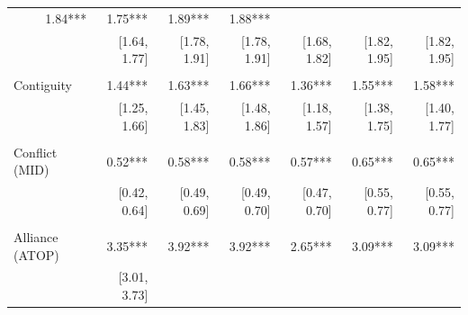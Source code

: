 \begin{table}[!h]
\begin{tabular}{lllllll}
  \multicolumn{1}{r}{1.84***} &
  \multicolumn{1}{r}{1.75***} &
  \multicolumn{1}{r}{1.89***} &
  \multicolumn{1}{r}{1.88***} \\
\multicolumn{1}{l}{} &
  \multicolumn{1}{|r}{[1.64,    1.77]} &
  \multicolumn{1}{r}{[1.78,    1.91]} &
  \multicolumn{1}{r}{[1.78,    1.91]} &
  \multicolumn{1}{r}{[1.68,    1.82]} &
  \multicolumn{1}{r}{[1.82,    1.95]} &
  \multicolumn{1}{r}{[1.82,    1.95]} \\
\multicolumn{1}{l}{} &
  \multicolumn{1}{|r}{} &
  \multicolumn{1}{r}{} &
  \multicolumn{1}{r}{} &
  \multicolumn{1}{r}{} &
  \multicolumn{1}{r}{} &
  \multicolumn{1}{r}{} \\
\multicolumn{1}{l}{Contiguity} &
  \multicolumn{1}{|r}{1.44***} &
  \multicolumn{1}{r}{1.63***} &
  \multicolumn{1}{r}{1.66***} &
  \multicolumn{1}{r}{1.36***} &
  \multicolumn{1}{r}{1.55***} &
  \multicolumn{1}{r}{1.58***} \\
\multicolumn{1}{l}{} &
  \multicolumn{1}{|r}{[1.25,    1.66]} &
  \multicolumn{1}{r}{[1.45,    1.83]} &
  \multicolumn{1}{r}{[1.48,    1.86]} &
  \multicolumn{1}{r}{[1.18,    1.57]} &
  \multicolumn{1}{r}{[1.38,    1.75]} &
  \multicolumn{1}{r}{[1.40,    1.77]} \\
\multicolumn{1}{l}{} &
  \multicolumn{1}{|r}{} &
  \multicolumn{1}{r}{} &
  \multicolumn{1}{r}{} &
  \multicolumn{1}{r}{} &
  \multicolumn{1}{r}{} &
  \multicolumn{1}{r}{} \\
\multicolumn{1}{l}{Conflict (MID)} &
  \multicolumn{1}{|r}{0.52***} &
  \multicolumn{1}{r}{0.58***} &
  \multicolumn{1}{r}{0.58***} &
  \multicolumn{1}{r}{0.57***} &
  \multicolumn{1}{r}{0.65***} &
  \multicolumn{1}{r}{0.65***} \\
\multicolumn{1}{l}{} &
  \multicolumn{1}{|r}{[0.42,    0.64]} &
  \multicolumn{1}{r}{[0.49,    0.69]} &
  \multicolumn{1}{r}{[0.49,    0.70]} &
  \multicolumn{1}{r}{[0.47,    0.70]} &
  \multicolumn{1}{r}{[0.55,    0.77]} &
  \multicolumn{1}{r}{[0.55,    0.77]} \\
\multicolumn{1}{l}{} &
  \multicolumn{1}{|r}{} &
  \multicolumn{1}{r}{} &
  \multicolumn{1}{r}{} &
  \multicolumn{1}{r}{} &
  \multicolumn{1}{r}{} &
  \multicolumn{1}{r}{} \\
\multicolumn{1}{l}{Alliance (ATOP)} &
  \multicolumn{1}{|r}{3.35***} &
  \multicolumn{1}{r}{3.92***} &
  \multicolumn{1}{r}{3.92***} &
  \multicolumn{1}{r}{2.65***} &
  \multicolumn{1}{r}{3.09***} &
  \multicolumn{1}{r}{3.09***} \\
\multicolumn{1}{l}{} &
  \multicolumn{1}{|r}{[3.01,    3.73]} &

\end{tabular}
\end{table}
